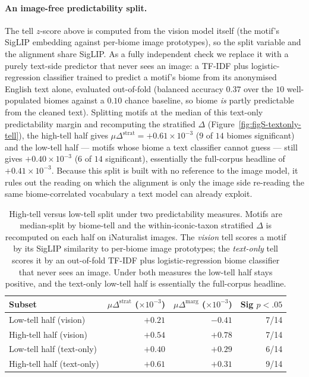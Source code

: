 \documentclass[11pt,a4paper]{article}
\begin{document}
\paragraph*{An image-free predictability split.} The tell
$z$-score above is computed from the vision model itself (the
motif's SigLIP embedding against per-biome image prototypes), so
the split variable and the alignment share SigLIP. As a fully
independent check we replace it with a purely text-side predictor
that never sees an image: a TF-IDF plus logistic-regression
classifier trained to predict a motif's biome from its anonymised
English text alone, evaluated out-of-fold (balanced accuracy
$0.37$ over the $10$ well-populated biomes against a $0.10$ chance
baseline, so biome \emph{is} partly predictable from the cleaned
text). Splitting motifs at the median of this text-only
predictability margin and recomputing the stratified $\Delta$
(Figure~\ref{fig:figS-textonly-tell}), the high-tell half gives
$\mu\Delta^{\text{strat}} = +0.61\times 10^{-3}$ ($9$ of $14$ biomes
significant) and the low-tell half --- motifs whose biome a text
classifier cannot guess --- still gives $+0.40\times 10^{-3}$ ($6$
of $14$ significant), essentially the full-corpus headline of
$+0.41\times 10^{-3}$. Because this split is built with no reference
to the image model, it rules out the reading on which the alignment
is only the image side re-reading the same biome-correlated
vocabulary a text model can already exploit.

\begin{table}[h!]
\centering
\caption{High-tell versus low-tell split under two predictability
measures. Motifs are median-split by biome-tell and the
within-iconic-taxon stratified $\Delta$ is recomputed on each half on
iNaturalist images. The \emph{vision} tell scores a motif by its
SigLIP similarity to per-biome image prototypes; the
\emph{text-only} tell scores it by an out-of-fold TF-IDF plus
logistic-regression biome classifier that never sees an image. Under
both measures the low-tell half stays positive, and the text-only
low-tell half is essentially the full-corpus headline.}\label{tab:biome-tell-split}
\begin{tabular}{lrrr}
\hline
Subset & $\mu\Delta^{\text{strat}}$ ($\times 10^{-3}$) & $\mu\Delta^{\text{marg}}$ ($\times 10^{-3}$) & Sig $p<.05$ \\
\hline
Low-tell half (vision)     & $+0.21$ & $-0.41$ & 7/14 \\
High-tell half (vision)    & $+0.54$ & $+0.78$ & 7/14 \\
\hline
Low-tell half (text-only)  & $+0.40$ & $+0.29$ & 6/14 \\
High-tell half (text-only) & $+0.61$ & $+0.31$ & 9/14 \\
\hline
\end{tabular}
\end{table}
\end{document}
